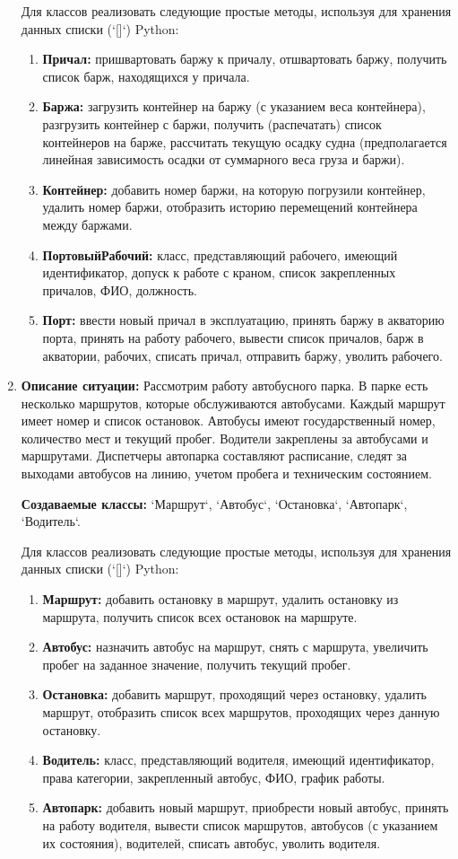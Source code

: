 \begin{enumerate}
Для классов реализовать следующие простые методы, используя для хранения данных списки (`[]`) Python:
\begin{enumerate}
    \item \textbf{Причал:} пришвартовать баржу к причалу, отшвартовать баржу, получить список барж, находящихся у причала.
    \item \textbf{Баржа:} загрузить контейнер на баржу (с указанием веса контейнера), разгрузить контейнер с баржи,
     получить (распечатать) список контейнеров на барже, рассчитать текущую осадку судна 
     (предполагается линейная зависимость осадки от суммарного веса груза и баржи).
    \item \textbf{Контейнер:} добавить номер баржи, на которую погрузили контейнер, удалить номер баржи, отобразить историю перемещений контейнера между баржами.
    \item \textbf{ПортовыйРабочий:} класс, представляющий рабочего, имеющий идентификатор, допуск к работе с краном, список закрепленных причалов, ФИО, должность.
    \item \textbf{Порт:} ввести новый причал в эксплуатацию, принять баржу в акваторию порта, принять на работу рабочего, вывести список причалов, барж в акватории, рабочих, списать причал, отправить баржу, уволить рабочего.
\end{enumerate}

\item
\textbf{Описание ситуации:}
Рассмотрим работу автобусного парка. В парке есть несколько маршрутов, которые обслуживаются автобусами. Каждый маршрут имеет номер и список остановок. Автобусы имеют государственный номер, количество мест и текущий пробег. Водители закреплены за автобусами и маршрутами. Диспетчеры автопарка составляют расписание, следят за выходами автобусов на линию, учетом пробега и техническим состоянием.

\textbf{Создаваемые классы:} `Маршрут`, `Автобус`, `Остановка`, `Автопарк`, `Водитель`.

Для классов реализовать следующие простые методы, используя для хранения данных списки (`[]`) Python:
\begin{enumerate}
    \item \textbf{Маршрут:} добавить остановку в маршрут, удалить остановку из маршрута, получить список всех остановок на маршруте.
    \item \textbf{Автобус:} назначить автобус на маршрут, снять с маршрута, увеличить пробег на заданное значение, получить текущий пробег.
    \item \textbf{Остановка:} добавить маршрут, проходящий через остановку, удалить маршрут, отобразить список всех маршрутов, проходящих через данную остановку.
    \item \textbf{Водитель:} класс, представляющий водителя, имеющий идентификатор, права категории, закрепленный автобус, ФИО, график работы.
    \item \textbf{Автопарк:} добавить новый маршрут, приобрести новый автобус, принять на работу водителя, вывести список маршрутов, автобусов (с указанием их состояния), водителей, списать автобус, уволить водителя.
\end{enumerate}


\end{enumerate}
